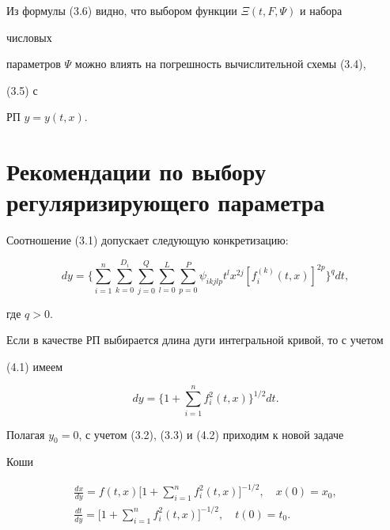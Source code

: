  


Из формулы (3.6) видно, что выбором функции $\Xi(t,F,\Psi)$ и набора 


числовых 


параметров $\Psi$ можно влиять на погрешность вычислительной схемы (3.4), 


(3.5) с 


РП $y=y(t,x)$. 


 


\section{Рекомендации по выбору регуляризирующего параметра} 


 


Соотношение (3.1) допускает следующую конкретизацию: 


\begin{equation} 


dy=\bigg\{\sum^n_{i=1}\sum^{D_i}_{k=0} 


\sum^Q_{j=0}\sum^L_{l=0}\sum^P_{p=0}\psi_{i k j l p}t^l x^{2j} 


[f^{(k)}_i(t,x)]^{2p}\bigg\}^q dt, 


\end{equation} 


где $q>0$. 


 


Если в качестве РП выбирается длина дуги интегральной кривой, то с учетом 


(4.1) имеем 


\begin{equation} 


dy=\bigg\{1+\sum^n_{i=1}f^2_i(t,x)\bigg\}^{1/2}dt. 


\end{equation} 


 


Полагая $y_0=0$, с учетом (3.2), (3.3) и (4.2) приходим к новой задаче 


Коши 


\begin{gather} 


\frac{dx}{dy}=f(t,x)\bigg[1+\sum^n_{i=1}f^2_i(t,x)\bigg]^{-1/2}, 


\quad x(0)=x_0,\\ 


% 


\frac{dt}{dy}=\bigg[1+\sum^n_{i=1}f^2_i(t,x)\bigg]^{-1/2}, 


\quad t(0)=t_0. 


\end{gather} 



